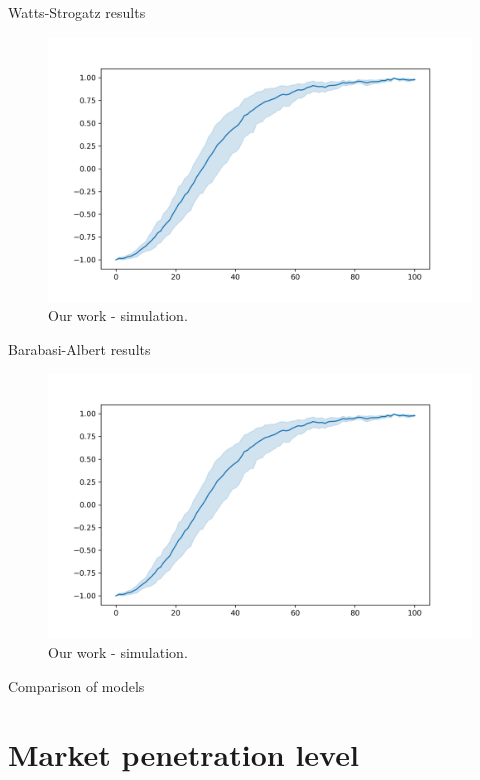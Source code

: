\documentclass[10pt]{beamer}
\begin{document}
\begin{frame}{Watts-Strogatz results}
	\begin{figure}
		\includegraphics[width=\textwidth]{../results/images/example.png}
		\caption{Our work - simulation.}
	\end{figure}
\end{frame}

\begin{frame}{Barabasi-Albert results}
	\begin{figure}
		\includegraphics[width=\textwidth]{../results/images/example.png}
		\caption{Our work - simulation.}
	\end{figure}
\end{frame}

\begin{frame}{Comparison of models}
	
\end{frame}

\section{Market penetration level}
\end{document}
